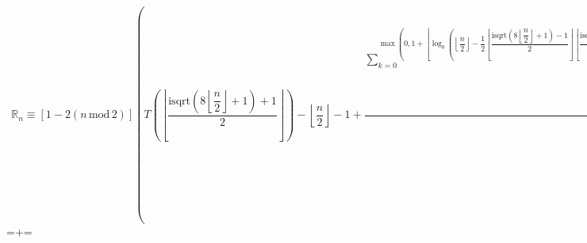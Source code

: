 \documentclass[12pt]{article}
\begin{document}
\hoffset=-1in\voffset=-1in\hbox{$\displaystyle~~\mathbb R_n\equiv\left[1-2(n\,\text{mod}\,2)\right]\left(T\left(\left\lfloor\dfrac{\text{isqrt}\!\left(8\left\lfloor\dfrac n2\right\rfloor+1\right)+1}2\right\rfloor\right)-\left\lfloor\dfrac n2\right\rfloor-1+\dfrac{\sum\limits_{k=0}^{\max\!\left(0,1+\left\lfloor\log_b\left(\left\lfloor\dfrac n2\right\rfloor-\dfrac12\left\lfloor\dfrac{\text{isqrt}\!\left(8\left\lfloor\dfrac n2\right\rfloor+1\right)-1}2\right\rfloor\left\lfloor\dfrac{\text{isqrt}\!\left(8\left\lfloor\dfrac n2\right\rfloor+1\right)+1}2\right\rfloor\right)\right\rfloor\right)}\left(\dfrac1b\left\lfloor\dfrac12\left\lfloor\dfrac n2\right\rfloor-\dfrac{\left\lfloor\dfrac{\text{isqrt}\!\left(8\left\lfloor\dfrac n2\right\rfloor+1\right)-1}2\right\rfloor\left\lfloor\dfrac{\text{isqrt}\!\left(8\left\lfloor\dfrac n2\right\rfloor+1\right)+1}2\right\rfloor}{b^k}\right\rfloor\text{mod}\,1\right)\exp\!\left(\max\!\left(0,1+\left\lfloor\log_b\left(\left\lfloor\dfrac n2\right\rfloor-\dfrac12\left\lfloor\dfrac{\text{isqrt}\!\left(8\left\lfloor\dfrac n2\right\rfloor+1\right)-1}2\right\rfloor\left\lfloor\dfrac{\text{isqrt}\!\left(8\left\lfloor\dfrac n2\right\rfloor+1\right)+1}2\right\rfloor\right)\right\rfloor\right)\ln b-k\ln b\right)}{\exp\!\left(\max\!\left(0,1+\left\lfloor\log_b\left(\left\lfloor\dfrac n2\right\rfloor-\dfrac12\left\lfloor\dfrac{\text{isqrt}\!\left(8\left\lfloor\dfrac n2\right\rfloor+1\right)-1}2\right\rfloor\left\lfloor\dfrac{\text{isqrt}\!\left(8\left\lfloor\dfrac n2\right\rfloor+1\right)+1}2\right\rfloor\right)\right\rfloor\right)\ln b\right)}\right)\forall n\in\mathbb N_0,~\text{base }b~~$}\pdfpageheight=\dimexpr{}+\relax\pdfpagewidth=\shipout{}\stop
\end{document}
